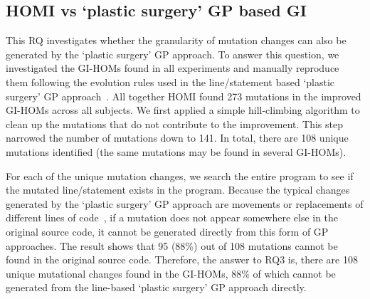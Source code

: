 \documentclass[oribibl]{llncs}
\begin{document}
{\subsection{HOMI vs `plastic surgery' GP based GI}
\label{sec_resstatic}


This RQ investigates whether the granularity of mutation changes can also be generated by the `plastic surgery' GP approach. To answer this question, we investigated the GI-HOMs found in all experiments and manually reproduce them following the evolution rules used in the line/statement based `plastic surgery' GP approach~\cite{justyna2013, 6733370}. All together HOMI found  273 mutations in the improved GI-HOMs across all subjects. We first applied a simple hill-climbing algorithm to clean up the mutations that do not contribute to the improvement. This step narrowed the number of mutations down to 141. %
In total, there are 108 unique mutations identified (the same mutations may be found in several GI-HOMs).

For each of the unique mutation changes, we search the entire program to see if the mutated line/statement exists in the program.  Because the typical changes generated by the `plastic surgery' GP approach are movements or replacements of different lines of code~\cite{justyna2013, 6733370}, if a mutation does not appear somewhere else in the original source code, it cannot be generated directly from this form of GP approaches. The result shows that 95 (88\%) out of 108 mutations cannot be found in the original source code. Therefore, the answer to RQ3 is, there are 108 unique mutational changes found in the GI-HOMs, 88\% of which cannot be generated from the line-based `plastic surgery' GP approach directly.


}
\end{document}
